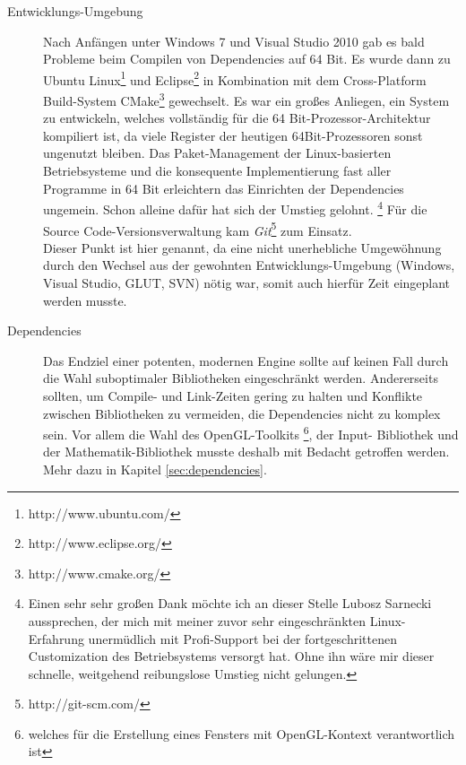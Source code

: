 \begin{description}

	\item[Entwicklungs-Umgebung]
	Nach Anfängen unter Windows 7 und Visual Studio 2010 gab es bald Probleme beim Compilen von Dependencies auf 
	64 Bit. Es wurde dann zu Ubuntu Linux\footnote{http://www.ubuntu.com/} und Eclipse\footnote{http://www.eclipse.org/} 
	in Kombination mit dem Cross-Platform Build-System CMake\footnote{http://www.cmake.org/} gewechselt. 
	Es war ein großes Anliegen, ein System zu entwickeln, welches vollständig für die 64 Bit-Prozessor-Architektur
	kompiliert ist, da viele Register der heutigen 64Bit-Prozessoren sonst ungenutzt bleiben.
	Das Paket-Management der Linux-basierten Betriebsysteme und die konsequente Implementierung fast aller Programme in 64 
	Bit erleichtern das Einrichten der Dependencies ungemein. Schon alleine dafür hat sich der Umstieg 
	gelohnt.
	\footnote{Einen sehr sehr großen Dank möchte ich an dieser Stelle Lubosz Sarnecki aussprechen, der mich mit 
	meiner zuvor sehr eingeschränkten Linux-Erfahrung unermüdlich mit Profi-Support bei der fortgeschrittenen Customization 
	des Betriebsystems versorgt hat. Ohne ihn wäre mir dieser schnelle, weitgehend reibungslose Umstieg nicht gelungen.}
	Für die Source Code-Versionsverwaltung kam \emph{Git}\footnote{http://git-scm.com/} zum Einsatz.\\
	Dieser Punkt ist hier genannt, da eine nicht unerhebliche Umgewöhnung durch den Wechsel aus der gewohnten
	Entwicklungs-Umgebung (Windows, Visual Studio, GLUT, SVN) nötig war, somit auch hierfür Zeit eingeplant werden musste.

	\item[Dependencies]
	\label{focus:dependencies}
	Das Endziel einer potenten, modernen Engine sollte auf keinen Fall durch die Wahl suboptimaler Bibliotheken 
	eingeschränkt werden. Andererseits sollten, um Compile- und Link-Zeiten gering zu halten und Konflikte zwischen 
	Bibliotheken zu vermeiden, die Dependencies nicht zu komplex sein. Vor allem die Wahl des OpenGL-Toolkits
	\footnote{welches für die Erstellung eines Fensters mit OpenGL-Kontext verantwortlich ist}, der Input-
	Bibliothek und der Mathematik-Bibliothek musste deshalb mit Bedacht getroffen werden. Mehr dazu in Kapitel 
	\ref{sec:dependencies}.
	
	
	

\end{description}
